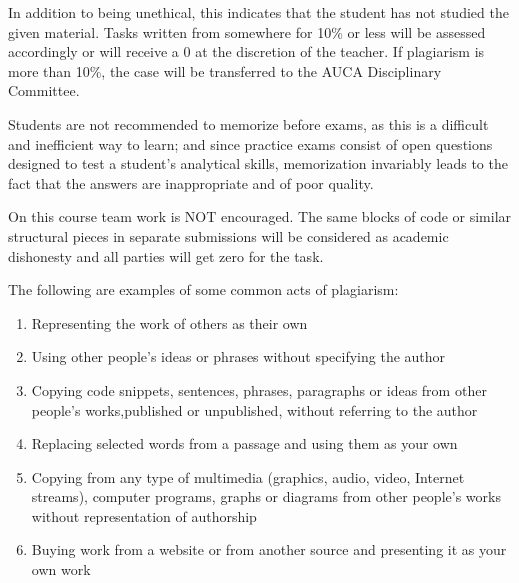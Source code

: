 \documentclass[12pt,a4paper,oneside]{article}
\begin{document}
        In addition to being unethical, this indicates that the student has not
        studied the given material. Tasks written from somewhere for 10\% or
        less will be assessed accordingly or will receive a 0 at the discretion
        of the teacher. If plagiarism is more than 10\%, the case will be
        transferred to the AUCA Disciplinary Committee.

        Students are not recommended to memorize before exams, as this is a
        difficult and inefficient way to learn; and since practice exams consist
        of open questions designed to test a student’s analytical skills,
        memorization invariably leads to the fact that the answers are
        inappropriate and of poor quality.

        On this course team work is NOT encouraged. The same blocks of code or
        similar structural pieces in separate submissions will be considered as
        academic dishonesty and all parties will get zero for the task.

        The following are examples of some common acts of plagiarism:

        \begin{enumerate}
            \item Representing the work of others as their own
            \item Using other people's ideas or phrases without specifying the
                  author
            \item Copying code snippets, sentences, phrases, paragraphs or ideas
                  from other people's works,published or unpublished, without
                  referring to the author
            \item Replacing selected words from a passage and using them as your
                  own
            \item Copying from any type of multimedia (graphics, audio, video,
                  Internet streams), computer programs, graphs or diagrams from
                  other people's works without representation of authorship
            \item Buying work from a website or from another source and
                  presenting it as your own work
        \end{enumerate}
\end{document}
